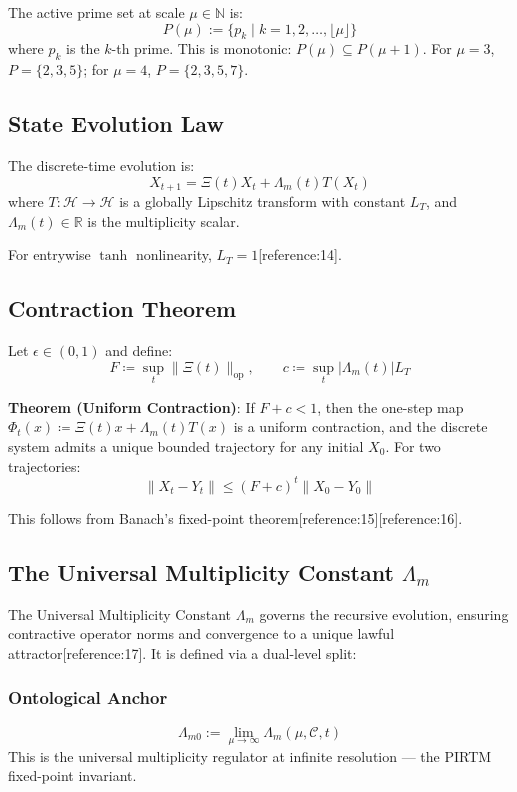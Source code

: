 \documentclass[11pt]{article}
\begin{document}
The active prime set at scale $\mu \in \mathbb{N}$ is:
\[
P(\mu) := \{ p_k \mid k = 1, 2, \dots, \lfloor \mu \rfloor \}
\]
where $p_k$ is the $k$-th prime. This is monotonic: $P(\mu) \subseteq P(\mu+1)$. For $\mu=3$, $P=\{2,3,5\}$; for $\mu=4$, $P=\{2,3,5,7\}$.

\subsection{State Evolution Law}

The discrete-time evolution is:
\[
X_{t+1} = \Xi(t) X_t + \Lambda_m(t) T(X_t)
\]
where $T: \mathcal{H} \to \mathcal{H}$ is a globally Lipschitz transform with constant $L_T$, and $\Lambda_m(t) \in \mathbb{R}$ is the multiplicity scalar.

For entrywise $\tanh$ nonlinearity, $L_T = 1$[reference:14].

\subsection{Contraction Theorem}

Let $\epsilon \in (0,1)$ and define:
\[
F \coloneqq \sup_t \|\Xi(t)\|_{\mathrm{op}}, \qquad c \coloneqq \sup_t |\Lambda_m(t)| L_T
\]

\textbf{Theorem (Uniform Contraction)}: If $F + c < 1$, then the one-step map $\Phi_t(x) \coloneqq \Xi(t)x + \Lambda_m(t)T(x)$ is a uniform contraction, and the discrete system admits a unique bounded trajectory for any initial $X_0$. For two trajectories:
\[
\|X_t - Y_t\| \leq (F + c)^t \|X_0 - Y_0\|
\]

This follows from Banach's fixed-point theorem[reference:15][reference:16].

\subsection{The Universal Multiplicity Constant $\Lambda_m$}

The Universal Multiplicity Constant $\Lambda_m$ governs the recursive evolution, ensuring contractive operator norms and convergence to a unique lawful attractor[reference:17]. It is defined via a dual-level split:

\subsubsection{Ontological Anchor}
\[
\Lambda_{m0} := \lim_{\mu \to \infty} \Lambda_m(\mu, \mathcal{C}, t)
\]
This is the universal multiplicity regulator at infinite resolution — the PIRTM fixed-point invariant.
\end{document}
